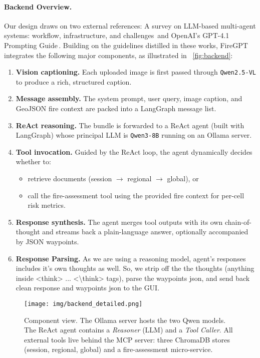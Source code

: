 \documentclass[lang=english,inputenc=utf8,fontsize=10pt]{ldvarticle}
\begin{document}
\paragraph{Backend Overview.}
Our design draws on two external references: A survey on LLM-based multi-agent systems: workflow, infrastructure, and challenges\,\cite{Li2024SurveyLLMMAS} and OpenAI’s GPT-4.1 Prompting Guide\,\cite{OpenAICookbook2024}. Building on the guidelines distilled in these works, FireGPT integrates the following 
major components, as illustrated in  ~\cref{fig:backend}:
\begin{enumerate}
  \item \textbf{Vision captioning.} Each uploaded image is first passed
        through \texttt{Qwen2.5-VL} to produce a rich, structured caption.
  \item \textbf{Message assembly.} The system prompt, user query, image
        caption, and GeoJSON fire context are packed into a LangGraph
        message list.
  \item \textbf{ReAct reasoning.} The bundle is forwarded to a ReAct
        agent (built with LangGraph) whose principal LLM is
        \texttt{Qwen3-8B} running on an Ollama server.
  \item \textbf{Tool invocation.} Guided by the ReAct loop, the agent
        dynamically decides whether to:
        \begin{itemize}
          \item retrieve documents (session $\rightarrow$ regional
                $\rightarrow$ global), or
          \item call the fire-assessment tool using the provided fire context
          for per-cell risk metrics.
        \end{itemize}
  \item \textbf{Response synthesis.} The agent merges tool outputs with
        its own chain-of-thought and streams back a plain-language answer,
        optionally accompanied by JSON waypoints.
  \item \textbf{Response Parsing.} As we are using a reasoning model,
        agent's responses includes it's own thoughts as well. So, we strip
        off the the thoughts (anything inside <think> ... <\textbackslash think> tags),
        parse the waypoints json, and send back clean response and waypoints
        json to the GUI.
\end{enumerate}

\begin{figure}[t]
  \centering
  \texttt{[image: img/backend\_detailed.png]}
  \caption{Component view.  The Ollama server hosts the two Qwen models.
           The ReAct agent contains a \emph{Reasoner} (LLM) and a
           \emph{Tool Caller}.  All external tools live behind the MCP
           server: three ChromaDB stores (session, regional, global) and
           a fire-assessment micro-service.}
  \label{fig:backend-detailed}
\end{figure}
\end{document}
